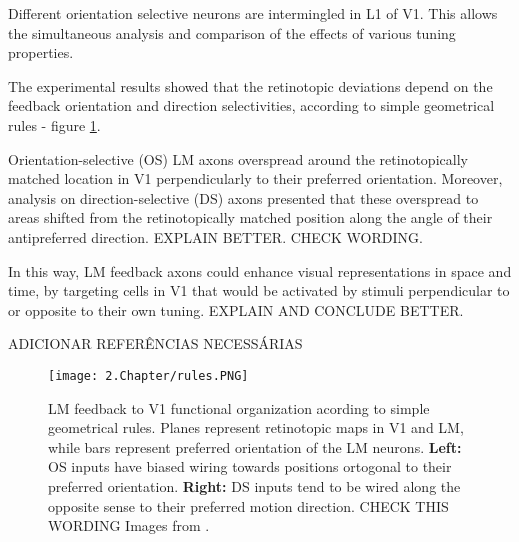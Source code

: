 Different orientation selective neurons are intermingled in L1 of V1. This allows the simultaneous analysis and comparison of the effects of various tuning properties.

The experimental results showed that the retinotopic deviations depend on the feedback orientation and direction selectivities, according to simple geometrical rules - figure \ref{rules}.

Orientation-selective (OS) LM axons overspread around the retinotopically matched location in V1 perpendicularly to their preferred orientation. Moreover, analysis on direction-selective (DS) axons presented that these overspread to areas shifted from the retinotopically matched position along the angle of their antipreferred direction. EXPLAIN BETTER. CHECK WORDING.

In this way, LM feedback axons could enhance visual representations in space and time, by targeting cells in V1 that would be activated by stimuli perpendicular to or opposite to their own tuning. EXPLAIN AND CONCLUDE BETTER.

ADICIONAR REFERÊNCIAS NECESSÁRIAS

\begin{figure}[H]
\center
\texttt{[image: 2.Chapter/rules.PNG]}
\caption{LM feedback to V1 functional organization acording to simple geometrical rules. Planes represent retinotopic maps in V1 and LM, while bars represent preferred orientation of the LM neurons. \newline \textbf{Left:} OS inputs have biased wiring towards positions ortogonal to their preferred orientation.
\newline \textbf{Right:} DS inputs tend to be wired along the opposite sense to their preferred motion direction.
CHECK THIS WORDING
\newline \newline \tiny{Images from \cite{Tiago}.}}
\label{rules}
\end{figure}
